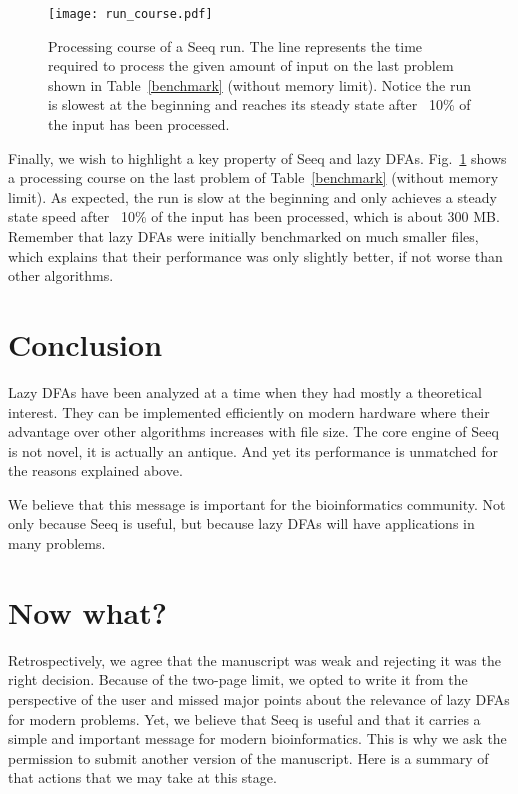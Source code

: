 \documentclass[12pt]{article}
\begin{document}
\begin{figure}[!tpb]
\centerline{\texttt{[image: run\_course.pdf]}}
\caption{Processing course of a Seeq run. The line represents the
time required to process the given amount of input on the last
problem shown in Table~\ref{benchmark} (without memory limit).
Notice the run is slowest at the beginning and reaches its steady
state after ~10\% of the input has been processed.
}\label{course}
\end{figure}

Finally, we wish to highlight a key property of Seeq and lazy DFAs.
Fig.~\ref{course} shows a processing course on the last
problem of Table~\ref{benchmark} (without memory limit). As expected,
the run is slow at the beginning and only achieves a steady state
speed after ~10\% of the input has been processed, which is about
300 MB. Remember that lazy DFAs were initially benchmarked on much
smaller files, which explains that their performance was only
slightly better, if not worse than other algorithms.


\section{Conclusion}

Lazy DFAs have been analyzed at a time when they had mostly a
theoretical interest. They can be implemented efficiently on
modern hardware where their advantage over other algorithms
increases with file size. The core engine of Seeq is not novel,
it is actually an antique. And yet its performance is unmatched
for the reasons explained above.

We believe that this message is important for the bioinformatics
community. Not only because Seeq is useful, but because
lazy DFAs will have applications in many problems.

\section{Now what?}

Retrospectively, we agree that the manuscript was weak and rejecting
it was the right decision. Because of the two-page limit, we opted
to write it from the perspective of the user and missed major points
about the relevance of lazy DFAs for modern problems. Yet, we
believe that Seeq is useful and that it carries a simple and important
message for modern bioinformatics. This is why we ask the permission
to submit another version of the manuscript. Here is a summary of
that actions that we may take at this stage.
\end{document}
